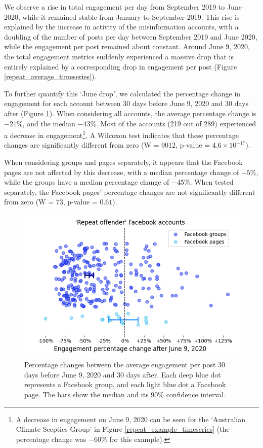 \documentclass[11pt,a4paper]{article}
\begin{document}
We observe a rise in total engagement per day from September 2019 to June 2020, while it remained stable from January to September 2019. 
This rise is explained by the increase in activity of the misinformation accounts, with a doubling of the number of posts per day between September 2019 and June 2020, while the engagement per post remained about constant.
Around June 9, 2020, the total engagement metrics suddenly experienced a massive drop that is entirely explained by a corresponding drop in engagement per post (Figure \ref{repeat_average_timeseries}).

To further quantify this ‘June drop’, we calculated the percentage change in engagement for each account between 30 days before June 9, 2020 and 30 days after (Figure \ref{repeat_june_drop_percentage_change}). 
When considering all accounts, the average percentage change is $-21\%$, and the median $-43\%$. Most of the accounts (219 out of 289) experienced a decrease in engagement\footnote{A decrease in engagement on June 9, 2020 can be seen for the `Australian Climate Sceptics Group' in Figure \ref{repeat_example_timeseries} (the percentage change was $-60\%$ for this example).}.
A Wilcoxon test indicates that these percentage changes are significantly different from zero (W = $9012$, p-value = $4.6 \times 10^{-17}$).

When considering groups and pages separately, it appears that the Facebook pages are not affected by this decrease, with a median percentage change of $-5\%$, while the groups have a median percentage change of $-45\%$. 
When tested separately, the Facebook pages' percentage changes are not significantly different from zero (W = $73$, p-value = $0.61$).

\begin{figure}[!h]
\centering
\includegraphics[width=\linewidth]{./../figure/repeat_june_drop_percentage_change.png}
\caption{Percentage changes between the average engagement per post 30 days before June 9, 2020 and 30 days after. 
Each deep blue dot represents a Facebook group, and each light blue dot a Facebook page.
The bars show the median and its $90\%$ confidence interval.}
\label{repeat_june_drop_percentage_change}
\end{figure}
\end{document}
